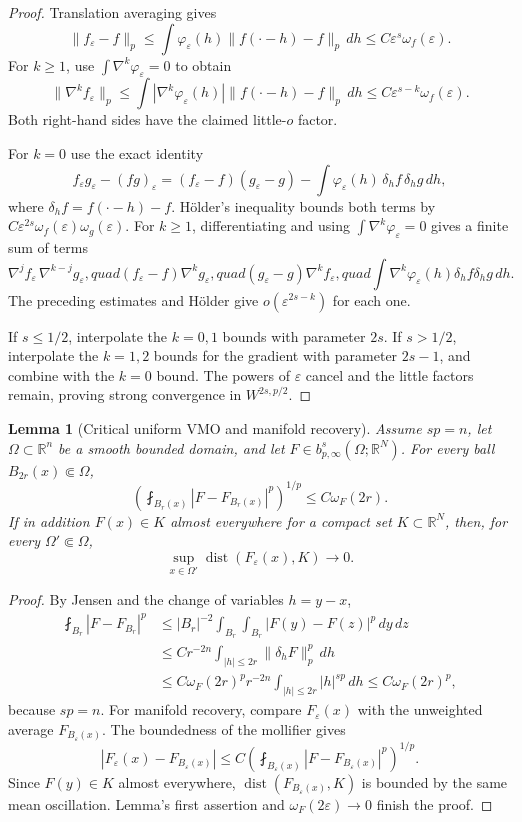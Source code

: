 \documentclass[11pt]{article}
\newtheorem{lemma}[theorem]{Lemma}
\newcommand{\R}{\mathbb R}
\newcommand{\eps}{\varepsilon}
\newcommand{\dist}{\operatorname{dist}}
\begin{document}
\begin{proof}
Translation averaging gives
\[
 \|f_\eps-f\|_p
 \leq\int\varphi_\eps(h)\|f(\cdot-h)-f\|_p\,dh
 \leq C\eps^s\omega_f(\eps).
\]
For $k\geq1$, use $\int\nabla^k\varphi_\eps=0$ to obtain
\[
 \|\nabla^k f_\eps\|_p
 \leq\int|\nabla^k\varphi_\eps(h)|
       \|f(\cdot-h)-f\|_p\,dh
 \leq C\eps^{s-k}\omega_f(\eps).
\]
Both right-hand sides have the claimed little-$o$ factor.

For $k=0$ use the exact identity
\[
 f_\eps g_\eps-(fg)_\eps
 =(f_\eps-f)(g_\eps-g)
 -\int\varphi_\eps(h)\,\delta_hf\,\delta_hg\,dh,
\]
where $\delta_hf=f(\cdot-h)-f$.  H\"older's inequality bounds both terms by
$C\eps^{2s}\omega_f(\eps)\omega_g(\eps)$.  For $k\geq1$, differentiating
and using $\int\nabla^k\varphi_\eps=0$ gives a finite sum of terms
\[
 \nabla^j f_\eps\,\nabla^{k-j}g_\eps,quad
 (f_\eps-f)\nabla^kg_\eps,quad
 (g_\eps-g)\nabla^kf_\eps,quad
 \int\nabla^k\varphi_\eps(h)\delta_hf\delta_hg\,dh.
\]
The preceding estimates and H\"older give
$o(\eps^{2s-k})$ for each one.

If $s\leq1/2$, interpolate the $k=0,1$ bounds with parameter $2s$.
If $s>1/2$, interpolate the $k=1,2$ bounds for the gradient with parameter
$2s-1$, and combine with the $k=0$ bound.  The powers of $\eps$ cancel and
the little factors remain, proving strong convergence in $W^{2s,p/2}$.
\end{proof}

\begin{lemma}[Critical uniform VMO and manifold recovery]\label{lem:vmo}
Assume $sp=n$, let $\Omega\subset\R^n$ be a smooth bounded domain, and let
$F\in b^s_{p,\infty}(\Omega;\R^N)$.  For every ball
$B_{2r}(x)\Subset\Omega$,
\[
 \left(\fint_{B_r(x)}|F-F_{B_r(x)}|^p\right)^{1/p}
 \leq C\omega_F(2r).
\]
If in addition $F(x)\in K$ almost everywhere for a compact set
$K\subset\R^N$, then, for every $\Omega'\Subset\Omega$,
\[
 \sup_{x\in\Omega'}\dist(F_\eps(x),K)\longrightarrow0.
\]
\end{lemma}

\begin{proof}
By Jensen and the change of variables $h=y-x$,
\begin{align*}
 \fint_{B_r}|F-F_{B_r}|^p
 &\leq |B_r|^{-2}\int_{B_r}\int_{B_r}|F(y)-F(z)|^p\,dy\,dz\\
 &\leq C r^{-2n}\int_{|h|\leq2r}\|\delta_hF\|_p^p\,dh\\
 &\leq C\omega_F(2r)^p r^{-2n}
          \int_{|h|\leq2r}|h|^{sp}\,dh
 \leq C\omega_F(2r)^p,
\end{align*}
because $sp=n$.  For manifold recovery, compare $F_\eps(x)$ with the
unweighted average $F_{B_\eps(x)}$.  The boundedness of the mollifier gives
\[
 |F_\eps(x)-F_{B_\eps(x)}|
 \leq C\left(\fint_{B_\eps(x)}|F-F_{B_\eps(x)}|^p\right)^{1/p}.
\]
Since $F(y)\in K$ almost everywhere,
$\dist(F_{B_\eps(x)},K)$ is bounded by the same mean oscillation.  Lemma's
first assertion and $\omega_F(2\eps)\to0$ finish the proof.
\end{proof}
\end{document}
